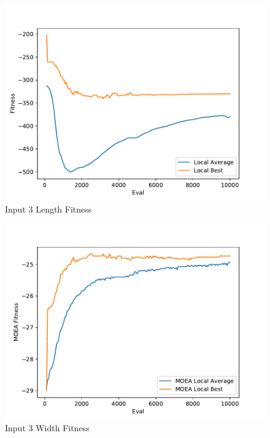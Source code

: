\documentclass{standalone}
\begin{document}
\begin{figure}[!htb]
	\caption{Input 3 Length Fitness}
	\label{fig:graph_3004}
	\includegraphics[width=\textwidth]{../graphs/graphs/3004.pdf}
\end{figure}


\begin{figure}[!htb]
	\caption{Input 3 Width Fitness}
	\label{fig:graph_3004_moea}
	\includegraphics[width=\textwidth]{../graphs/graphs/3004_moea.pdf}
\end{figure}
\end{document}
